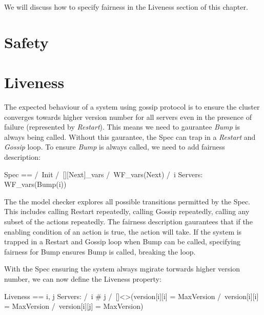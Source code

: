 We will discuss how to specify fairness in the Liveness section of this chapter.

\section{Safety}

\section{Liveness}

The expected behaviour of a system using gossip protocol is to ensure the
cluster converges towards higher version number for all servers even in the
presence of failure (represented by \textit{Restart}). This means we need to
gaurantee \textit{Bump} is always being called. Without this gaurantee, the Spec
can trap in a \textit{Restart} and \textit{Gossip} loop. To ensure \textit{Bump}
is always called, we need to add fairness description:\newline 

\begin{tla}
Spec ==
  /\ Init
  /\ [][Next]_vars
  /\ WF_vars(Next)
  /\ \A i \in Servers: 
    WF_vars(Bump(i))
\end{tla}
\begin{tlatex}
%
%
%
%
%
%
\end{tlatex}

The the model checker explores all possible transitions permitted by the Spec.
This includes calling Restart repeatedly, calling Gossip repeatedly, calling any
subset of the actions repeatedly. The fairness description gaurantees that if
the enabling condition of an action is true, the action will take. If the system
is trapped in a Restart and Gossip loop when Bump can be called, specifying fairness 
for Bump ensures Bump is called, breaking the loop.\newline

With the Spec ensuring the system always mgirate torwards higher version number, 
we can now define the Liveness property:\newline

\begin{tla}
Liveness == 
    \E i, j \in Servers: 
        /\ i # j
        /\ []<>(version[i][i] = MaxVersion
             /\ version[i][i] = MaxVersion 
             /\ version[i][j] = MaxVersion)
\end{tla}
\begin{tlatex}
%
%
%
%
%
\end{tlatex}\newline

